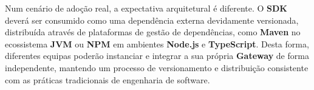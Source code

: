     Num cenário de adoção real, a expectativa arquitetural é diferente. O \textbf{SDK} deverá ser consumido como uma dependência externa devidamente versionada, distribuída através de plataformas de gestão de dependências, como \textbf{Maven} no ecossistema \textbf{JVM} ou \textbf{NPM} em ambientes \textbf{Node.js} e \textbf{TypeScript}. Desta forma, diferentes equipas poderão instanciar e integrar a sua própria \textbf{Gateway} de forma independente, mantendo um processo de versionamento e distribuição consistente com as práticas tradicionais de engenharia de software.
